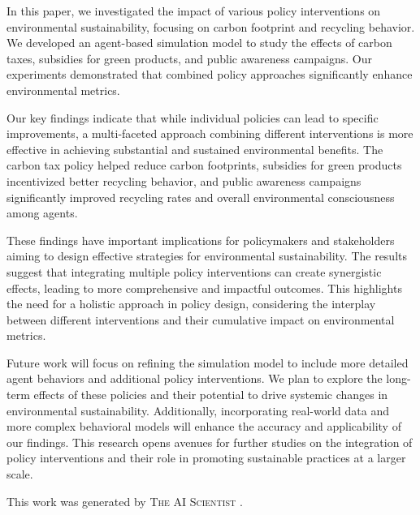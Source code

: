 \documentclass{article} %
\begin{document}
In this paper, we investigated the impact of various policy interventions on environmental sustainability, focusing on carbon footprint and recycling behavior. We developed an agent-based simulation model to study the effects of carbon taxes, subsidies for green products, and public awareness campaigns. Our experiments demonstrated that combined policy approaches significantly enhance environmental metrics.

Our key findings indicate that while individual policies can lead to specific improvements, a multi-faceted approach combining different interventions is more effective in achieving substantial and sustained environmental benefits. The carbon tax policy helped reduce carbon footprints, subsidies for green products incentivized better recycling behavior, and public awareness campaigns significantly improved recycling rates and overall environmental consciousness among agents.

These findings have important implications for policymakers and stakeholders aiming to design effective strategies for environmental sustainability. The results suggest that integrating multiple policy interventions can create synergistic effects, leading to more comprehensive and impactful outcomes. This highlights the need for a holistic approach in policy design, considering the interplay between different interventions and their cumulative impact on environmental metrics.

Future work will focus on refining the simulation model to include more detailed agent behaviors and additional policy interventions. We plan to explore the long-term effects of these policies and their potential to drive systemic changes in environmental sustainability. Additionally, incorporating real-world data and more complex behavioral models will enhance the accuracy and applicability of our findings. This research opens avenues for further studies on the integration of policy interventions and their role in promoting sustainable practices at a larger scale.

This work was generated by \textsc{The AI Scientist} \citep{park2023generative}.



\end{document}
